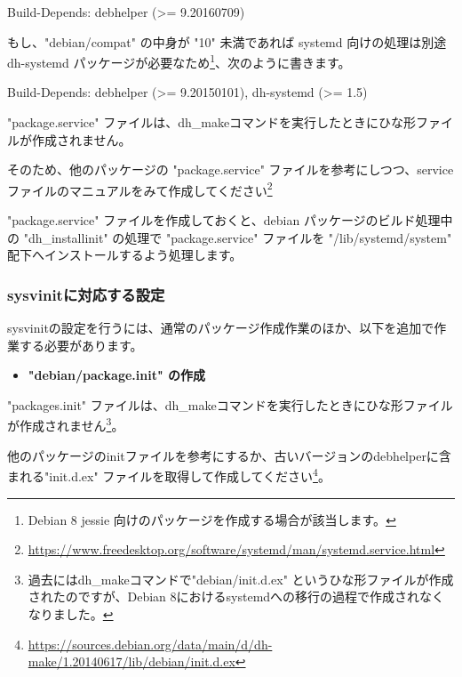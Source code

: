 \documentclass[mingoth,a4paper]{jsarticle}
\begin{document}
\begin{commandline}
Build-Depends: debhelper (>= 9.20160709)
\end{commandline}

もし、"debian/compat" の中身が "10" 未満であれば systemd 向けの処理は別途 dh-systemd パッケージが必要なため\footnote{Debian 8 jessie 向けのパッケージを作成する場合が該当します。}、次のように書きます。

\begin{commandline}
Build-Depends: debhelper (>= 9.20150101), dh-systemd (>= 1.5)
\end{commandline}




"package.service" ファイルは、dh\_makeコマンドを実行したときにひな形ファイルが作成されません。

そのため、他のパッケージの "package.service" ファイルを参考にしつつ、serviceファイルのマニュアルをみて作成してください\footnote{\url{https://www.freedesktop.org/software/systemd/man/systemd.service.html}}

"package.service" ファイルを作成しておくと、debian パッケージのビルド処理中の "dh\_installinit" の処理で "package.service" ファイルを "/lib/systemd/system" 配下へインストールするよう処理します。


\subsubsection{sysvinitに対応する設定}


sysvinitの設定を行うには、通常のパッケージ作成作業のほか、以下を追加で作業する必要があります。

\begin{itemize}
\item \bf{"debian/package.init"} の作成
\end{itemize}




"packages.init" ファイルは、dh\_makeコマンドを実行したときにひな形ファイルが作成されません\footnote{過去にはdh\_makeコマンドで"debian/init.d.ex" というひな形ファイルが作成されたのですが、Debian 8におけるsystemdへの移行の過程で作成されなくなりました。}。


他のパッケージのinitファイルを参考にするか、古いバージョンのdebhelperに含まれる"init.d.ex" ファイルを取得して作成してください\footnote{\url{https://sources.debian.org/data/main/d/dh-make/1.20140617/lib/debian/init.d.ex}}。
\end{document}

